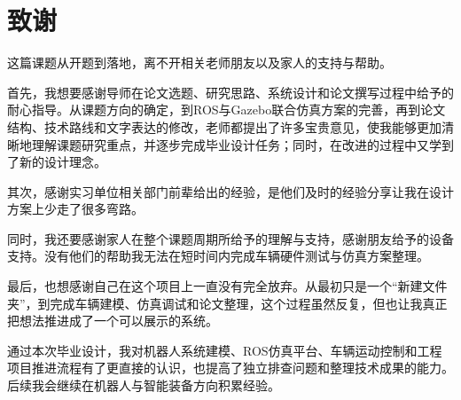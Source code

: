 
\section*{致\qquad 谢}

这篇课题从开题到落地，离不开相关老师朋友以及家人的支持与帮助。

首先，我想要感谢导师在论文选题、研究思路、系统设计和论文撰写过程中给予的耐心指导。从课题方向的确定，到ROS与Gazebo联合仿真方案的完善，再到论文结构、技术路线和文字表达的修改，老师都提出了许多宝贵意见，使我能够更加清晰地理解课题研究重点，并逐步完成毕业设计任务；同时，在改进的过程中又学到了新的设计理念。

其次，感谢实习单位相关部门前辈给出的经验，是他们及时的经验分享让我在设计方案上少走了很多弯路。

同时，我还要感谢家人在整个课题周期所给予的理解与支持，感谢朋友给予的设备支持。没有他们的帮助我无法在短时间内完成车辆硬件测试与仿真方案整理。

最后，也想感谢自己在这个项目上一直没有完全放弃。从最初只是一个“新建文件夹”，到完成车辆建模、仿真调试和论文整理，这个过程虽然反复，但也让我真正把想法推进成了一个可以展示的系统。

通过本次毕业设计，我对机器人系统建模、ROS仿真平台、车辆运动控制和工程项目推进流程有了更直接的认识，也提高了独立排查问题和整理技术成果的能力。后续我会继续在机器人与智能装备方向积累经验。
